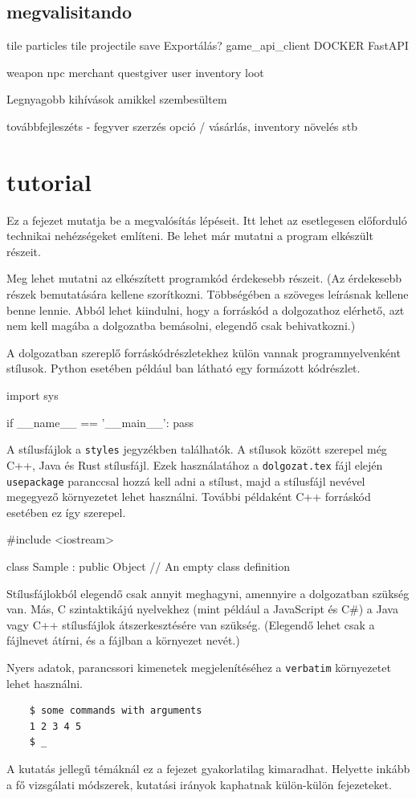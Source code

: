 \section{megvalisitando}

tile
particles
tile
projectile
save
Exportálás?
game\_api\_client
DOCKER
FastAPI




weapon 
npc
merchant
questgiver
user
inventory
loot

Legnyagobb kihívások amikkel szembesültem

továbbfejleszéts - fegyver szerzés opció / vásárlás, inventory növelés stb

\chapter{tutorial}



Ez a fejezet mutatja be a megvalósítás lépéseit.
Itt lehet az esetlegesen előforduló technikai nehézségeket említeni.
Be lehet már mutatni a program elkészült részeit.

Meg lehet mutatni az elkészített programkód érdekesebb részeit.
(Az érdekesebb részek bemutatására kellene szorítkozni.
Többségében a szöveges leírásnak kellene benne lennie.
Abból lehet kiindulni, hogy a forráskód a dolgozathoz elérhető, azt nem kell magába a dolgozatba bemásolni, elegendő csak behivatkozni.)

A dolgozatban szereplő forráskódrészletekhez külön vannak programnyelvenként stílusok.
Python esetében például ban látható egy formázott kódrészlet.
\begin{python}[caption={Python példa},label=py:test]
    import sys
    
    if __name__ == '__main__':
    pass
\end{python}

A stílusfájlok a \texttt{styles} jegyzékben találhatók.
A stílusok között szerepel még C++, Java és Rust stílusfájl.
Ezek használatához a \texttt{dolgozat.tex} fájl elején \texttt{usepackage} paranccsal hozzá kell adni a stílust, majd a stílusfájl nevével megegyező környezetet lehet használni.
További példaként C++ forráskód esetében ez így szerepel.
\begin{cpp}
    #include <iostream>
    
class Sample : public Object
{
    // An empty class definition
    }
\end{cpp}
Stílusfájlokból elegendő csak annyit meghagyni, amennyire a dolgozatban szükség van.
Más, C szintaktikájú nyelvekhez (mint például a JavaScript és C\#) a Java vagy C++ stílusfájlok átszerkesztésére van szükség.
(Elegendő lehet csak a fájlnevet átírni, és a fájlban a környezet nevét.)

Nyers adatok, parancssori kimenetek megjelenítéséhez a \texttt{verbatim} környezetet lehet használni.
\begin{verbatim}
    $ some commands with arguments
    1 2 3 4 5
    $ _
\end{verbatim}

A kutatás jellegű témáknál ez a fejezet gyakorlatilag kimaradhat.
Helyette inkább a fő vizsgálati módszerek, kutatási irányok kaphatnak külön-külön fejezeteket.
